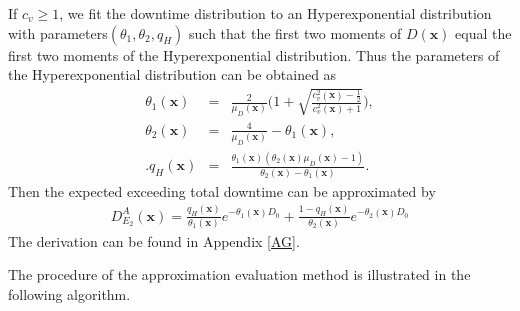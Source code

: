\documentclass[preprint,12pt]{elsarticle}
\begin{document}
If $c_{v} \geq 1$, we fit the downtime distribution to an Hyperexponential distribution with parameters$(\theta_{1},\theta_{2}, q_{H})$ such that the first two moments of $D(\boldsymbol{x})$ equal the first two moments of the Hyperexponential distribution. Thus the parameters of the Hyperexponential distribution can be obtained as
\begin{eqnarray}
     \theta_{1}(\boldsymbol{x}) &=& \frac{2}{\mu_{D}(\boldsymbol{x})}\bigg(1+\sqrt{\frac{c^{2}_{v}(\boldsymbol{x})-\frac{1}{2}}{c^{2}_{v}(\boldsymbol{x})+1}} \bigg), \label{theta11}\\
     \theta_{2}(\boldsymbol{x}) &=& \frac{4}{\mu_{D}(\boldsymbol{x})} - \theta_{1}(\boldsymbol{x}), \label{theta12}\\.
     q_{H}(\boldsymbol{x}) &=& \frac{\theta_1(\boldsymbol{x})(\theta_2(\boldsymbol{x})\mu_{D}(\boldsymbol{x})-1)}{\theta_2(\boldsymbol{x}) -\theta_1(\boldsymbol{x})}. \label{q2}
\end{eqnarray}
Then the expected exceeding total downtime can be approximated by
\begin{eqnarray}
D_{E_{2}}^{A}(\boldsymbol{x}) =\frac{q_{H}(\boldsymbol{x})}{\theta_{1}(\boldsymbol{x})} e^{-\theta_{1}(\boldsymbol{x}) D_0 } + \frac{1-q_{H}(\boldsymbol{x})}{\theta_{2}(\boldsymbol{x})} e^{-\theta_{2}(\boldsymbol{x}) D_0} \label{EXD2}
\end{eqnarray}
The derivation can be found in Appendix \ref{AG}.


The procedure of the approximation evaluation method is illustrated in the following algorithm.
\end{document}
